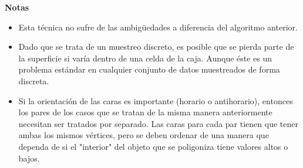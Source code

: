 \documentclass[12pt]{article}
\begin{document}
\textbf{Notas}
\begin{itemize}
\item Esta técnica no sufre de las ambigüedades a diferencia del algoritmo anterior.
\item Dado que se trata de un muestreo discreto, es posible que se pierda parte de la superficie si varía dentro de una celda de la caja. Aunque éste es un problema estándar en cualquier conjunto de datos muestreados de forma discreta.
\item Si la orientación de las caras es importante (horario o antihorario), entonces los pares de los casos que se tratan de la misma manera anteriormente necesitan ser tratados por separado. Las caras para cada par tienen que tener ambas los mismos vértices, pero se deben ordenar de una manera que dependa de si el "interior" del objeto que se poligoniza tiene valores altos o bajos.
\end{itemize}
\end{document}
